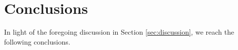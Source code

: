 %
%
%

\section{Conclusions} \label{sec:conc}
In light of the foregoing discussion in Section \ref{sec:discussion}, we reach the following conclusions.

